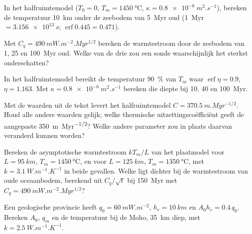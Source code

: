 \begin{exercise}[$\star$]\label{exo:b3:lithosphere-thermal-models:3}
In het halfruimtemodel ($T_0 = 0$, $T_m = \qty{1450}{\celsius}$, $\kappa =
\qty{0.8e-6}{m^2.s^{-1}}$), bereken de temperatuur \qty{10}{km} onder de
zeebodem van \qty{5}{Myr} oud (\qty{1}{Myr} $= \qty{3.156e13}{s}$; $\operatorname{erf}
0.445 = 0.471$).
\end{exercise}

\begin{exercise}[$\star$]\label{exo:b3:lithosphere-thermal-models:4}
Met $C_q = \qty{490}{mW.m^{-2}.Myr^{1/2}}$ bereken de warmtestroom door
de zeebodem van 1, 25 en \qty{100}{Myr} oud. Welke van de drie zou een sonde
waarschijnlijk het sterkst onderschatten?
\end{exercise}

\begin{exercise}[$\star\star$]\label{exo:b3:lithosphere-thermal-models:5}
In het halfruimtemodel bereikt de temperatuur \qty{90}{\percent} van $T_m$
waar $\operatorname{erf}\eta = 0.9$, $\eta = 1.163$. Met $\kappa =
\qty{0.8e-6}{m^2.s^{-1}}$ bereken die diepte bij 10, 40 en \qty{100}{Myr}.
\end{exercise}

\begin{exercise}[$\star\star$]\label{exo:b3:lithosphere-thermal-models:6}
Met de waarden uit de tekst levert het halfruimtemodel $C =
\qty{370.5}{m.Myr^{-1/2}}$. Houd alle andere waarden gelijk; welke thermische
uitzettingscoëfficiënt geeft de aangepaste \qty{350}{m.Myr^{-1/2}}? Welke andere
parameter zou in plaats daarvan veranderd kunnen worden?
\end{exercise}

\begin{exercise}[$\star\star$]\label{exo:b3:lithosphere-thermal-models:7}
Bereken de asymptotische warmtestroom $kT_m/L$ van het plaatmodel voor $L =
\qty{95}{km}$, $T_m = \qty{1450}{\celsius}$, en voor $L = \qty{125}{km}$,
$T_m = \qty{1350}{\celsius}$, met $k = \qty{3.1}{W.m^{-1}.K^{-1}}$ in beide gevallen.
Welke ligt dichter bij de warmtestroom van oude oceaanbodem, berekend uit $C_q/\sqrt t$
bij \qty{150}{Myr} met $C_q = \qty{490}{mW.m^{-2}.Myr^{1/2}}$?
\end{exercise}

\begin{exercise}[$\star\star$]\label{exo:b3:lithosphere-thermal-models:8}
Een geologische provincie heeft $q_0 = \qty{60}{mW.m^{-2}}$, $h_r = \qty{10}{km}$ en $A_0h_r =
0.4\,q_0$. Bereken $A_0$, $q_m$ en de temperatuur bij de Moho, \qty{35}{km}
diep, met $k = \qty{2.5}{W.m^{-1}.K^{-1}}$.
\end{exercise}

